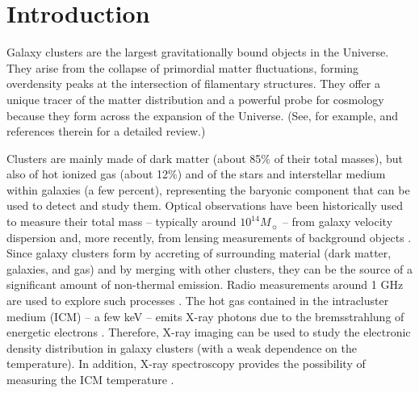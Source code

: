 \documentclass[twocolumn,traditabstract]{aa}
\begin{document}
\section{Introduction}\label{sec:introduction}
Galaxy clusters are the largest gravitationally bound objects in the Universe. They arise from the collapse of primordial matter fluctuations, forming overdensity peaks at the intersection of filamentary structures. They offer a unique tracer of the matter distribution and a powerful probe for cosmology because they form across the expansion of the Universe. (See, for example, \cite{allen2011} and references therein for a detailed review.)

Clusters are mainly made of dark matter (about 85\% of their total masses), but also of hot ionized gas (about 12\%) and of the stars and interstellar medium within galaxies (a few percent), representing the baryonic component that can be used to detect and study them. Optical observations have been historically used to measure their total mass \citep{zwicky1933} -- typically around $10^{14} M_{\sun}$ -- from galaxy velocity dispersion and, more recently, from lensing measurements of background objects \citep[see][for a review]{bartelmann2010}. Since galaxy clusters form by accreting of surrounding material (dark matter, galaxies, and gas) and by merging with other clusters, they can be the source of a significant amount of non-thermal emission. Radio measurements around 1 GHz are used to explore such processes \citep[e.g.,][]{feretti2011}. The hot gas contained in the intracluster medium (ICM) -- a few keV -- emits X-ray photons due to the bremsstrahlung of energetic electrons \citep[see][]{sarazin1988}. Therefore, X-ray imaging can be used to study the electronic density distribution in galaxy clusters (with a weak dependence on the temperature). In addition, X-ray spectroscopy provides the possibility of measuring the ICM temperature \citep[see, for example,][]{bohringer2010}. 
\end{document}
